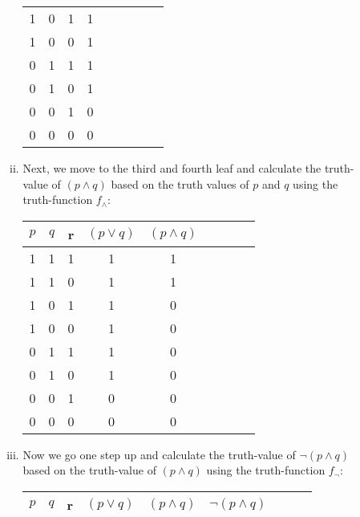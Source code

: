 \begin{enumerate}[\thesection.1]
\begin{enumerate}
\begin{enumerate}[(i)]
\begin{center}
\begin{tabular}{c c c | c | c  c  c  c  c}
1 & 0 & 1 & 1 & &&&& \\

1 & 0 & 0  & 1 & &&& \\

0 & 1 &  1 & 1 & &&& \\

0 & 1 & 0 & 1 & & &&& \\

0 & 0 & 1 & 0 & & &&&  \\

0 & 0 & 0 & 0 & & &&&

\end{tabular}

\end{center}

\item Next, we move to the third and fourth leaf and calculate the truth-value of $(p\land q)$ based on the truth values of $p$ and $q$ using the truth-function $f_\land$:

\begin{center}
\begin{tabular}{c c c | c | c | c  c  c  c}
$p$ & $q$  & r & $(p\lor q)$ &  $(p\land q)$ & \hspace*{15ex} \\\hline

1 & 1 & 1 & 1 & 1&& \\

1 & 1 & 0 & 1 & 1&&  \\

1 & 0 & 1 & 1 & 0&& \\

1 & 0 & 0  & 1 & 0& \\

0 & 1 &  1 & 1 & 0& \\

0 & 1 & 0 & 1 &0&& \\

0 & 0 & 1 & 0  &0&&  \\

0 & 0 & 0 & 0  &0&&

\end{tabular}

\end{center}

\item Now we go one step up and calculate the truth-value of $\neg(p\land q)$ based on the truth-value of $(p\land q)$ using the truth-function $f_\neg$:

\begin{center}
\begin{tabular}{c c c | c | c | c | c  c  c}
$p$ & $q$  & r & $(p\lor q)$ & $(p\land q)$ &  $\neg (p\land q)$ & \hspace*{10ex} \\\hline


\end{tabular}
\end{center}
\end{enumerate}
\end{enumerate}
\end{enumerate}
